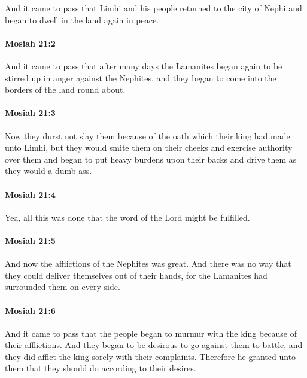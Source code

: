 			And it came to pass that Limhi and his people returned to the city of Nephi
			and began to dwell in the land again in peace.

		\paragraph{Mosiah 21:2} %
			\label{MOSIAH-21-2}

			And it came to pass that after many days
			the Lamanites began again to be stirred up in anger against the Nephites,
			and they began to come into the borders of the land round about.

		\paragraph{Mosiah 21:3} %
			\label{MOSIAH-21-3}

			Now they durst not slay them because of the oath
			which their king had made unto Limhi,
			but they would smite them on their cheeks
			and exercise authority over them
			and began to put heavy burdens upon their backs
			and drive them as they would a dumb ass.

		\paragraph{Mosiah 21:4} %
			\label{MOSIAH-21-4}

			Yea, all this was done that the word of the Lord might be fulfilled.

		\paragraph{Mosiah 21:5} %
			\label{MOSIAH-21-5}

			And now the afflictions of the Nephites was great.
			And there was no way that they could deliver themselves out of their hands,
			for the Lamanites had surrounded them on every side.

		\paragraph{Mosiah 21:6} %
			\label{MOSIAH-21-6}

			And it came to pass that
			the people began to murmur with the king because of their afflictions.
			And they began to be desirous to go against them to battle,
			and they did afflct the king sorely with their complaints.
			Therefore he granted unto them that they should do according to their desires.


